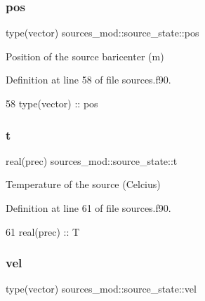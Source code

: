 \subsubsection{\texorpdfstring{pos}{pos}}
{\footnotesize\ttfamily type(vector) sources\+\_\+mod\+::source\+\_\+state\+::pos\hspace{0.3cm}{\ttfamily [private]}}



Position of the source baricenter (m) 



Definition at line 58 of file sources.\+f90.


\begin{DoxyCode}
58         \textcolor{keywordtype}{type}(vector) :: pos
\end{DoxyCode}
\mbox{\label{structsources__mod_1_1source__state_a7d51970a13f9664bbaf9d09afea0b363}} 
\subsubsection{\texorpdfstring{t}{t}}
{\footnotesize\ttfamily real(prec) sources\+\_\+mod\+::source\+\_\+state\+::t\hspace{0.3cm}{\ttfamily [private]}}



Temperature of the source (Celcius) 



Definition at line 61 of file sources.\+f90.


\begin{DoxyCode}
61         \textcolor{keywordtype}{real(prec)} :: T
\end{DoxyCode}
\mbox{\label{structsources__mod_1_1source__state_a52c6f025eb262a7a07b2a8b4ec7065ac}} 
\subsubsection{\texorpdfstring{vel}{vel}}
{\footnotesize\ttfamily type(vector) sources\+\_\+mod\+::source\+\_\+state\+::vel\hspace{0.3cm}{\ttfamily [private]}}



